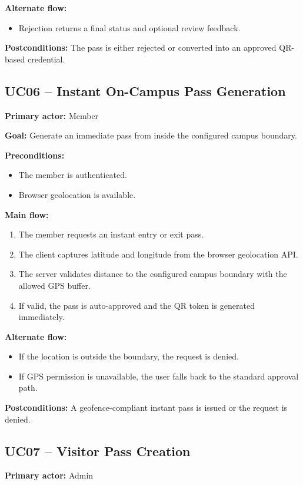 \documentclass[12pt,letterpaper]{article}
\begin{document}
\textbf{Alternate flow:}
\begin{itemize}
    \item Rejection returns a final status and optional review feedback.
\end{itemize}

\textbf{Postconditions:} The pass is either rejected or converted into an approved QR-based credential.

\subsection{UC06 -- Instant On-Campus Pass Generation}
\textbf{Primary actor:} Member

\textbf{Goal:} Generate an immediate pass from inside the configured campus boundary.

\textbf{Preconditions:}
\begin{itemize}
    \item The member is authenticated.
    \item Browser geolocation is available.
\end{itemize}

\textbf{Main flow:}
\begin{enumerate}
    \item The member requests an instant entry or exit pass.
    \item The client captures latitude and longitude from the browser geolocation API.
    \item The server validates distance to the configured campus boundary with the allowed GPS buffer.
    \item If valid, the pass is auto-approved and the QR token is generated immediately.
\end{enumerate}

\textbf{Alternate flow:}
\begin{itemize}
    \item If the location is outside the boundary, the request is denied.
    \item If GPS permission is unavailable, the user falls back to the standard approval path.
\end{itemize}

\textbf{Postconditions:} A geofence-compliant instant pass is issued or the request is denied.

\subsection{UC07 -- Visitor Pass Creation}
\textbf{Primary actor:} Admin
\end{document}
